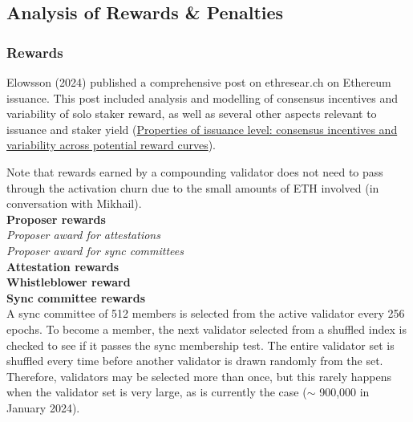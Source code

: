 \subsection{Analysis of Rewards \& Penalties}
\subsubsection{Rewards}
Elowsson (2024) published a comprehensive post on ethresear.ch on Ethereum issuance. This post included analysis and modelling of consensus incentives and variability of solo staker reward, as well as several other aspects relevant to issuance and staker yield (\href{https://ethresear.ch/t/properties-of-issuance-level-consensus-incentives-and-variability-across-potential-reward-curves/18448}{Properties of issuance level: consensus incentives and variability across potential reward curves}).

Note that rewards earned by a compounding validator does not need to pass through the activation churn due to the small amounts of ETH involved (in conversation with Mikhail). \\ 

\noindent
\textbf{Proposer rewards} \\

\noindent
\textit{Proposer award for attestations} \\


\noindent
\textit{Proposer award for sync committees} \\




\noindent
\textbf{Attestation rewards} \\



\noindent
\textbf{Whistleblower reward} \\


\noindent
\textbf{Sync committee rewards} \\
A sync committee of 512 members is selected from the active validator every 256 epochs. To become a member, the next validator selected from a shuffled index is checked to see if it passes the sync membership test. The entire validator set is shuffled every time before another validator is drawn randomly from the set. Therefore, validators may be selected more than once, but this rarely happens when the validator set is very large, as is currently the case ($\sim$ 900,000 in January 2024).

